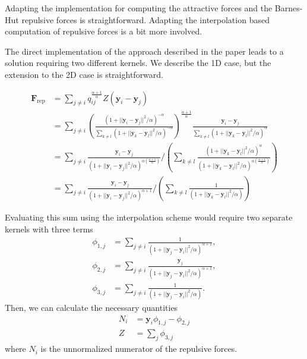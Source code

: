 \documentclass[11pt]{article}
\begin{document}
Adapting the implementation for computing the attractive forces and the Barnes-Hut repulsive forces is straightforward. Adapting the interpolation based computation of repulsive forces is a bit more involved.

The direct implementation of the approach described in the paper leads to a solution requiring two different kernels. We describe the 1D case, but the extension to the 2D case is straightforward.

\begin{align}
\mathbf{F}_\text{rep} &= \sum_{j \neq i} q_{ij}^{\frac{\alpha+1}{\alpha}} Z \left ( \mathbf{y}_i - \mathbf{y}_j \right ) \\
&=
\sum_{j \neq i} \left( \frac{\left ( 1 + || \mathbf{y}_i - \mathbf{y}_j ||^2 / \alpha \right )^{-\alpha}}{\sum_{k \neq l} \left ( 1 + || \mathbf{y}_k - \mathbf{y}_l ||^2 / \alpha \right )^{-\alpha}} \right) ^{\frac{\alpha+1}{\alpha}}
\frac{\mathbf{y}_i - \mathbf{y}_j}{\sum_{k \neq l}\left ( 1 + || \mathbf{y}_k - \mathbf{y}_l ||^2 / \alpha \right )^{\alpha}} \\
&=
\sum_{j \neq i} \frac{\mathbf{y}_i - \mathbf{y}_j}{\left ( 1 + || \mathbf{y}_i - \mathbf{y}_j ||^2 / \alpha \right )^{\alpha \left( \frac{\alpha+1}{\alpha} \right)}}
\bigg/
\left( \sum_{k \neq l} \frac{\left( 1 + || \mathbf{y}_k - \mathbf{y}_l ||^2 / \alpha \right)^\alpha}{\left( 1 + || \mathbf{y}_k - \mathbf{y}_l ||^2 / \alpha \right)^{\alpha \left(\frac{\alpha+1}{\alpha} \right) }} \right) \\
&=
\sum_{j \neq i} \frac{\mathbf{y}_i - \mathbf{y}_j}{\left ( 1 + || \mathbf{y}_i - \mathbf{y}_j ||^2 / \alpha \right )^{\alpha + 1}}
\bigg/
\left( \sum_{k \neq l} \frac{1}{\left( 1 + || \mathbf{y}_k - \mathbf{y}_l ||^2 / \alpha \right)} \right)
\end{align}

Evaluating this sum using the interpolation scheme would require two separate kernels with three terms
\begin{align}
\phi_{1,j} &= \sum_{j \neq i} \frac{1}{\left( 1 + || \mathbf{y}_j - \mathbf{y}_i ||^2 / \alpha \right)^{\alpha+1}}, \\
\phi_{2,j} &= \sum_{j \neq i} \frac{\mathbf{y}_j}{\left( 1 + || \mathbf{y}_j - \mathbf{y}_i ||^2 / \alpha \right)^{\alpha+1}}, \\
\phi_{3,j} &= \sum_{j \neq i} \frac{1}{\left( 1 + || \mathbf{y}_j - \mathbf{y}_i ||^2 / \alpha \right)}.
\end{align}
Then, we can calculate the necessary quantities
\begin{align}
N_i &= \mathbf{y}_i \phi_{1,j} - \phi_{2,j} \\
Z &= \sum_j \phi_{3,j}
\end{align}
where $N_i$ is the unnormalized numerator of the repulsive forces.
\end{document}
